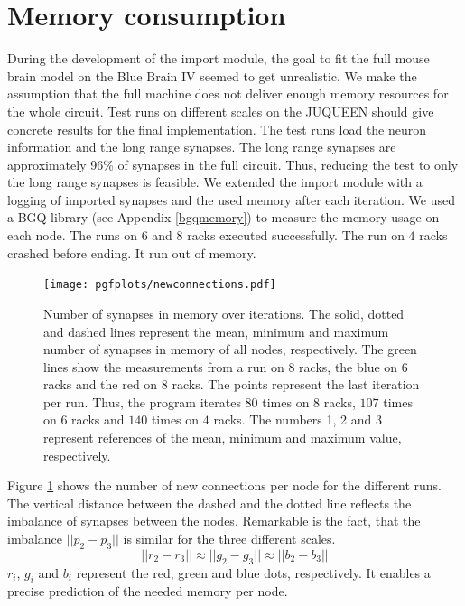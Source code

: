 \section{Memory consumption}
During the development of the import module, the goal to fit the full mouse brain model on the
Blue Brain IV seemed to get unrealistic. We make the assumption that the full machine does not deliver enough memory resources for the whole circuit.
Test runs on different scales on the JUQUEEN should give concrete results for the final implementation.
The test runs load the neuron information and the long range synapses.
The long range synapses are approximately 96\% of synapses in the full circuit.
Thus, reducing the test to only the long range synapses is feasible.
We extended the import module with a logging of imported synapses and the used memory after each iteration.
We used a BGQ library (see Appendix \ref{bgqmemory}) to measure the memory usage on each node.
The runs on $6$ and $8$ racks executed successfully.
The run on $4$ racks crashed before ending.
It run out of memory.
\begin{figure}[h!]
\begin{center}
 \texttt{[image: pgfplots/newconnections.pdf]}
\end{center}
\caption{Number of synapses in memory over iterations.
The solid, dotted and dashed lines represent the mean, minimum and maximum number of synapses in memory of all nodes, respectively.
The green lines show the measurements from a run on 8 racks, the blue on 6 racks and the red on 8 racks.
The points represent the last iteration per run.
Thus, the program iterates $80$ times on $8$ racks, $107$ times on $6$ racks and $140$ times on $4$ racks.
The numbers 1, 2 and 3 represent references of the mean, minimum and maximum value, respectively.
 }
\label{fig:newconnections}
\end{figure}
Figure \ref{fig:newconnections} shows the number of new connections per node for the different runs.
The vertical distance between the dashed and the dotted line reflects the imbalance of synapses between the nodes.
Remarkable is the fact, that the imbalance $||p_2-p_3||$ is similar for the three different scales.
\begin{equation}
	||r_2-r_3|| \approx ||g_2-g_3|| \approx ||b_2-b_3||
\end{equation}
$r_i$, $g_i$ and $b_i$ represent the red, green and blue dots, respectively.
It enables a precise prediction of the needed memory per node.
